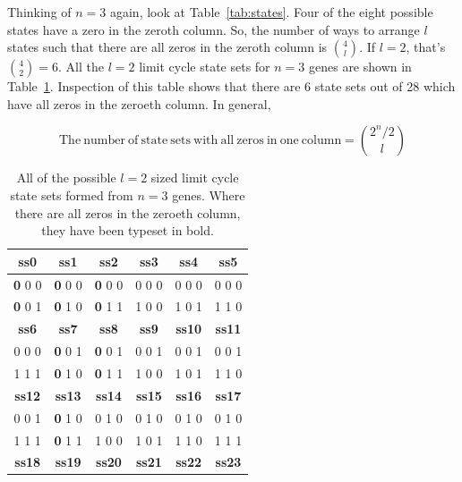 \documentclass[11pt, a4paper]{article}
\begin{document}
Thinking of $n=3$ again, look at Table~\ref{tab:states}. Four of the
eight possible states have a zero in the zeroth column. So, the number
of ways to arrange $l$ states such that there are all zeros in the
zeroth column is $\binom{4}{l}$. If $l=2$, that's
$\binom{4}{2}=6$. All the $l=2$ limit cycle state sets for $n=3$ genes
are shown in Table~\ref{tab:n3l2}. Inspection of this table shows that
there are 6 state sets out of 28 which have all zeros in the zeroeth
column. In general,

\begin{equation}
\mathrm{The~number~of~state~sets~with~all~zeros~in~one~column} = \binom{2^n/2}{l}
\end{equation}


\begin{table}[h!]
  \begin{center}
    \caption{All of the possible $l=2$ sized limit cycle state sets formed from
    $n=3$ genes. Where there are all zeros in the zeroeth column, they
    have been typeset in bold.}
    \label{tab:n3l2}
    \begin{tabular}{c|c|c|c|c|c}
      \textbf{ss0} & \textbf{ss1} & \textbf{ss2} & \textbf{ss3} &\textbf{ss4} & \textbf{ss5} \\
      \hline
      \textbf{0} 0 0       & \textbf{0} 0 0       & \textbf{0} 0 0       & 0 0 0       & 0 0 0      & 0 0 0       \\
      \textbf{0} 0 1       & \textbf{0} 1 0       & \textbf{0} 1 1       & 1 0 0       & 1 0 1      & 1 1 0       \\
      \hline
      \textbf{ss6} & \textbf{ss7} & \textbf{ss8} & \textbf{ss9} &\textbf{ss10} & \textbf{ss11} \\
      \hline
      0 0 0       & \textbf{0} 0 1       & \textbf{0} 0 1       & 0 0 1       & 0 0 1      & 0 0 1       \\
      1 1 1       & \textbf{0} 1 0       & \textbf{0} 1 1       & 1 0 0       & 1 0 1      & 1 1 0       \\
      \hline
      \textbf{ss12} & \textbf{ss13} & \textbf{ss14} & \textbf{ss15} &\textbf{ss16} & \textbf{ss17} \\
      \hline
      0 0 1       & \textbf{0} 1 0       & 0 1 0       & 0 1 0       & 0 1 0      & 0 1 0       \\
      1 1 1       & \textbf{0} 1 1       & 1 0 0       & 1 0 1       & 1 1 0      & 1 1 1       \\
      \hline
      \textbf{ss18} & \textbf{ss19} & \textbf{ss20} & \textbf{ss21} &\textbf{ss22} & \textbf{ss23} \\

\end{tabular}
\end{center}
\end{table}
\end{document}
